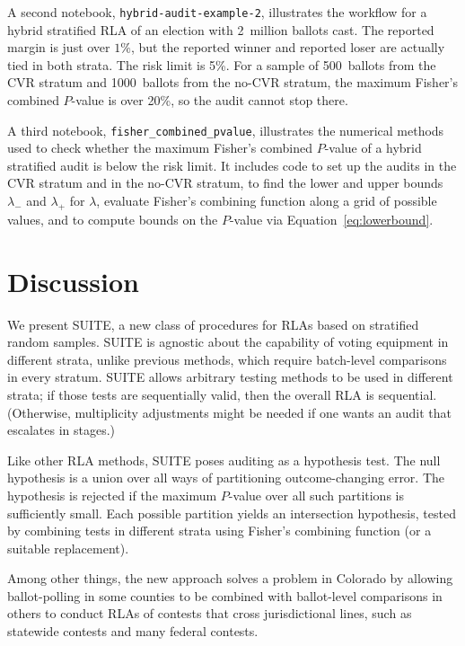 \documentclass[runningheads]{llncs}
\begin{document}
A second notebook, \texttt{hybrid-audit-example-2}, illustrates the 
workflow for a hybrid stratified RLA of an election with 2~million ballots cast.
The reported margin is just over $1\%$, but the reported winner
and reported loser are actually tied in both strata.  
The risk limit is 5\%.
For a sample of 500~ballots from the CVR stratum and 1000~ballots from the no-CVR stratum, the maximum Fisher's combined $P$-value is over 20\%, so the audit cannot stop there.

A third notebook, \texttt{fisher\_combined\_pvalue}, illustrates the numerical methods used
to check whether the maximum Fisher's combined $P$-value of a hybrid stratified audit is below the risk limit.
It includes code to set up the audits in the CVR stratum and in the no-CVR stratum,
 to find the lower and upper bounds $\lambda_-$ and $\lambda_+$ for $\lambda$,
 evaluate Fisher's combining function along a grid of possible values,
and to compute bounds on the $P$-value via Equation~\ref{eq:lowerbound}.

\section{Discussion} \label{sec:discussion}

We present SUITE, a new class of procedures for RLAs based on stratified random samples.
SUITE is agnostic about the capability of voting equipment in different strata, unlike
previous methods, which require batch-level comparisons in every stratum.
SUITE allows arbitrary testing methods to be used in different strata; if those tests are sequentially valid, then the overall RLA is sequential. 
(Otherwise, multiplicity adjustments might be needed if one wants an audit that escalates in stages.)

Like other RLA methods, SUITE poses auditing as a hypothesis test.
The null hypothesis is a union over all ways of partitioning outcome-changing error.
The hypothesis is rejected if the maximum $P$-value over all such partitions is sufficiently
small.
Each possible partition yields an intersection hypothesis, tested by
combining tests in different strata using Fisher's combining function (or a suitable
replacement). 

Among other things, the new approach solves a problem in Colorado by allowing ballot-polling in some counties to be combined with ballot-level comparisons in others to conduct RLAs of contests that cross jurisdictional lines, such as statewide contests and many federal contests.
\end{document}
